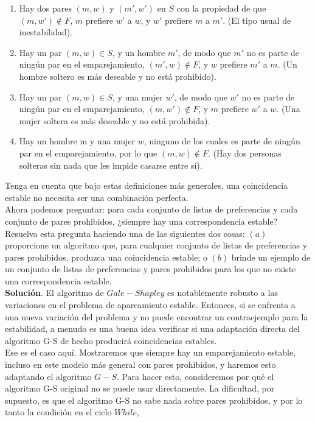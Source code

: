 \documentclass[a4paper]{article}
\begin{document}
\begin{enumerate}
    \item  Hay dos pares $(m,w)$ y $(m',w')$ en $S$ con la propiedad de que $(m,w')∉F$, $m$ prefiere $w'$ a $w$, y $w'$ prefiere $m$ a $m'$. (El tipo usual de inestabilidad).
    \item Hay un par $(m,w)∈S$, y un hombre $m'$, de modo que $m'$ no es parte de ningún par en el emparejamiento, $(m',w)∉F$, y $w$ prefiere $m'$ a $m$. (Un hombre soltero es más deseable y no está prohibido).
    \item  Hay un par $(m,w)∈S$, y una mujer $w'$, de modo que $w'$ no es parte de ningún par en el emparejamiento, $(m,w')∉F$, y $m$ prefiere $w'$ a $w$. (Una mujer soltera es más deseable y no está prohibida).
    \item Hay un hombre m y una mujer $w$, ninguno de los cuales es parte de ningún par en el emparejamiento, por lo que $(m,w)∉F$. (Hay dos personas solteras sin nada que les impide casarse entre sí).
   \end{enumerate}

Tenga en cuenta que bajo estas definiciones más generales, una coincidencia estable no necesita ser una combinación perfecta.\\

Ahora podemos preguntar: para cada conjunto de listas de preferencias y cada conjunto de pares prohibidos, ¿siempre hay una correspondencia estable? Resuelva esta pregunta haciendo una de las siguientes dos cosas: $(a)$ proporcione un algoritmo que, para cualquier conjunto de listas de preferencias y pares prohibidos, produzca una coincidencia estable; o $(b)$ brinde un ejemplo de un conjunto de listas de preferencias y pares prohibidos para los que no existe una correspondencia estable.\\

\textbf{Solución}. El algoritmo de $Gale-Shapley$ es notablemente robusto a las variaciones en el problema de apareamiento estable. Entonces, si se enfrenta a una nueva variación del problema y no puede encontrar un contraejemplo para la estabilidad, a menudo es una buena idea verificar si una adaptación directa del algoritmo G-S de hecho producirá coincidencias estables.\\

Ese es el caso aquí. Mostraremos que siempre hay un emparejamiento estable, incluso en este modelo más general con pares prohibidos, y haremos esto adaptando el algoritmo $G-S$. Para hacer esto, consideremos por qué el algoritmo G-S original no se puede usar directamente. La dificultad, por supuesto, es que el algoritmo G-S no sabe nada sobre pares prohibidos, y por lo tanto la condición en el ciclo $While$,\\
\end{document}
